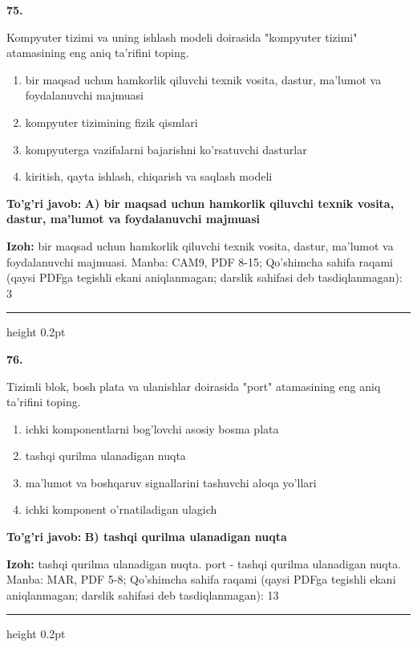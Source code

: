 \documentclass[10pt,a4paper]{article}
\begin{document}
{\bfseries\sffamily\color{ink} 75.}
\par
Kompyuter tizimi va uning ishlash modeli doirasida "kompyuter tizimi" atamasining eng aniq ta'rifini toping.
\begin{enumerate}[label=\Alph*),leftmargin=9mm]
\item bir maqsad uchun hamkorlik qiluvchi texnik vosita, dastur, ma'lumot va foydalanuvchi majmuasi
\item kompyuter tizimining fizik qismlari
\item kompyuterga vazifalarni bajarishni ko'rsatuvchi dasturlar
\item kiritish, qayta ishlash, chiqarish va saqlash modeli
\end{enumerate}
\begin{tcolorbox}[enhanced,breakable,colback=teal!4,colframe=teal!60!black,boxrule=0.45pt,arc=1.2mm,left=2.7mm,right=2.7mm,top=1.8mm,bottom=1.8mm,before skip=2mm,after skip=2mm]
{\bfseries\sffamily\color{teal}To'g'ri javob:} \textbf{A) bir maqsad uchun hamkorlik qiluvchi texnik vosita, dastur, ma'lumot va foydalanuvchi majmuasi}
\par\smallskip
{\bfseries Izoh:} bir maqsad uchun hamkorlik qiluvchi texnik vosita, dastur, ma'lumot va foydalanuvchi majmuasi. Manba: CAM9, PDF 8-15; Qo'shimcha sahifa raqami (qaysi PDFga tegishli ekani aniqlanmagan; darslik sahifasi deb tasdiqlanmagan): 3
\end{tcolorbox}
\vspace{2mm}\hrule height 0.2pt\vspace{3mm}

{\bfseries\sffamily\color{ink} 76.}
\par
Tizimli blok, bosh plata va ulanishlar doirasida "port" atamasining eng aniq ta'rifini toping.
\begin{enumerate}[label=\Alph*),leftmargin=9mm]
\item ichki komponentlarni bog'lovchi asosiy bosma plata
\item tashqi qurilma ulanadigan nuqta
\item ma'lumot va boshqaruv signallarini tashuvchi aloqa yo'llari
\item ichki komponent o'rnatiladigan ulagich
\end{enumerate}
\begin{tcolorbox}[enhanced,breakable,colback=teal!4,colframe=teal!60!black,boxrule=0.45pt,arc=1.2mm,left=2.7mm,right=2.7mm,top=1.8mm,bottom=1.8mm,before skip=2mm,after skip=2mm]
{\bfseries\sffamily\color{teal}To'g'ri javob:} \textbf{B) tashqi qurilma ulanadigan nuqta}
\par\smallskip
{\bfseries Izoh:} tashqi qurilma ulanadigan nuqta. port - tashqi qurilma ulanadigan nuqta. Manba: MAR, PDF 5-8; Qo'shimcha sahifa raqami (qaysi PDFga tegishli ekani aniqlanmagan; darslik sahifasi deb tasdiqlanmagan): 13
\end{tcolorbox}
\vspace{2mm}\hrule height 0.2pt\vspace{3mm}
\end{document}
